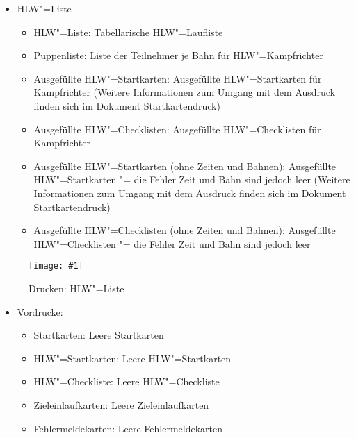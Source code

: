\documentclass[11pt,a4paper,twoside,ngerman]{article}
\newcommand{\hsmimage}[3]{\begin{figure}[!ht]\centering\texttt{[image: \#1]}\caption{#3}\end{figure}}
\begin{document}
\begin{itemize}

\item HLW"=Liste
\begin{itemize}

\item HLW"=Liste: Tabellarische HLW"=Laufliste


\item Puppenliste: Liste der Teilnehmer je Bahn für HLW"=Kampfrichter


\item Ausgefüllte HLW"=Startkarten: Ausgefüllte HLW"=Startkarten für Kampfrichter (Weitere Informationen zum Umgang mit dem Ausdruck finden sich im Dokument \glqq{}Startkartendruck\grqq{})


\item Ausgefüllte HLW"=Checklisten: Ausgefüllte HLW"=Checklisten für Kampfrichter


\item Ausgefüllte HLW"=Startkarten (ohne Zeiten und Bahnen): Ausgefüllte HLW"=Startkarten "= die Fehler Zeit und Bahn sind jedoch leer (Weitere Informationen zum Umgang mit dem Ausdruck finden sich im Dokument \glqq{}Startkartendruck\grqq{})


\item Ausgefüllte HLW"=Checklisten (ohne Zeiten und Bahnen): Ausgefüllte HLW"=Checklisten "= die Fehler Zeit und Bahn sind jedoch leer


\end{itemize}



\end{itemize}

\hsmimage{pics/panel-drucken-hlw-liste}{.80\textwidth}{Drucken: HLW"=Liste}

\begin{itemize}

\item Vordrucke:
\begin{itemize}

\item Startkarten: Leere Startkarten


\item HLW"=Startkarten: Leere HLW"=Startkarten


\item HLW"=Checkliste: Leere HLW"=Checkliste


\item Zieleinlaufkarten: Leere Zieleinlaufkarten


\item Fehlermeldekarten: Leere Fehlermeldekarten


\end{itemize}



\end{itemize}
\end{document}
